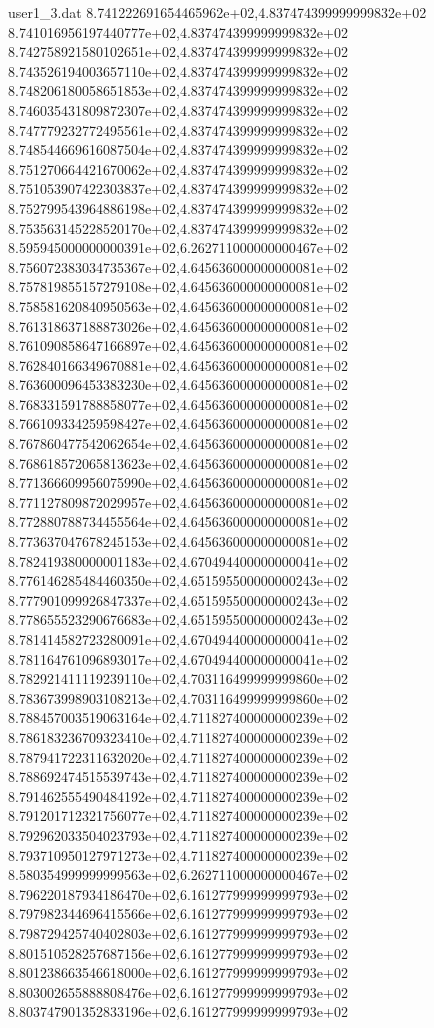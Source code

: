 \begin{filecontents}{user1_3.dat}
8.741222691654465962e+02,4.837474399999999832e+02
8.741016956197440777e+02,4.837474399999999832e+02
8.742758921580102651e+02,4.837474399999999832e+02
8.743526194003657110e+02,4.837474399999999832e+02
8.748206180058651853e+02,4.837474399999999832e+02
8.746035431809872307e+02,4.837474399999999832e+02
8.747779232772495561e+02,4.837474399999999832e+02
8.748544669616087504e+02,4.837474399999999832e+02
8.751270664421670062e+02,4.837474399999999832e+02
8.751053907422303837e+02,4.837474399999999832e+02
8.752799543964886198e+02,4.837474399999999832e+02
8.753563145228520170e+02,4.837474399999999832e+02
8.595945000000000391e+02,6.262711000000000467e+02
8.756072383034735367e+02,4.645636000000000081e+02
8.757819855157279108e+02,4.645636000000000081e+02
8.758581620840950563e+02,4.645636000000000081e+02
8.761318637188873026e+02,4.645636000000000081e+02
8.761090858647166897e+02,4.645636000000000081e+02
8.762840166349670881e+02,4.645636000000000081e+02
8.763600096453383230e+02,4.645636000000000081e+02
8.768331591788858077e+02,4.645636000000000081e+02
8.766109334259598427e+02,4.645636000000000081e+02
8.767860477542062654e+02,4.645636000000000081e+02
8.768618572065813623e+02,4.645636000000000081e+02
8.771366609956075990e+02,4.645636000000000081e+02
8.771127809872029957e+02,4.645636000000000081e+02
8.772880788734455564e+02,4.645636000000000081e+02
8.773637047678245153e+02,4.645636000000000081e+02
8.782419380000001183e+02,4.670494400000000041e+02
8.776146285484460350e+02,4.651595500000000243e+02
8.777901099926847337e+02,4.651595500000000243e+02
8.778655523290676683e+02,4.651595500000000243e+02
8.781414582723280091e+02,4.670494400000000041e+02
8.781164761096893017e+02,4.670494400000000041e+02
8.782921411119239110e+02,4.703116499999999860e+02
8.783673998903108213e+02,4.703116499999999860e+02
8.788457003519063164e+02,4.711827400000000239e+02
8.786183236709323410e+02,4.711827400000000239e+02
8.787941722311632020e+02,4.711827400000000239e+02
8.788692474515539743e+02,4.711827400000000239e+02
8.791462555490484192e+02,4.711827400000000239e+02
8.791201712321756077e+02,4.711827400000000239e+02
8.792962033504023793e+02,4.711827400000000239e+02
8.793710950127971273e+02,4.711827400000000239e+02
8.580354999999999563e+02,6.262711000000000467e+02
8.796220187934186470e+02,6.161277999999999793e+02
8.797982344696415566e+02,6.161277999999999793e+02
8.798729425740402803e+02,6.161277999999999793e+02
8.801510528257687156e+02,6.161277999999999793e+02
8.801238663546618000e+02,6.161277999999999793e+02
8.803002655888808476e+02,6.161277999999999793e+02
8.803747901352833196e+02,6.161277999999999793e+02

\end{filecontents}

